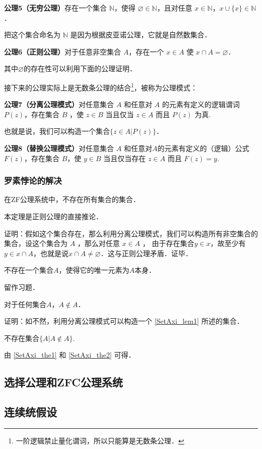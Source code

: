 \textbf{公理5（无穷公理）}存在一个集合 $\mathbb{N}$，使得 $\varnothing\in\mathbb{N}$，且对任意 $x\in \mathbb{N}$，$x\cup\{x\}\in\mathbb{N}$．

把这个集合命名为 $\mathbb{N}$ 是因为根据皮亚诺公理，它就是自然数集合．

\textbf{公理6（正则公理）}对于任意非空集合 $A$，存在一个 $x\in A$ 使 $x\cap A=\varnothing$．

其中$\varnothing$的存在性可以利用下面的公理证明．

接下来的公理实际上是无数条公理的结合\footnote{一阶逻辑禁止量化谓词，所以只能算是无数条公理．}，被称为公理模式：

\textbf{公理7（分离公理模式）}对任意集合 $A$ 和任意对 $A$ 的元素有定义的逻辑谓词 $P(z)$，存在集合 $B$ ，使 $z\in B$ 当且仅当 $z\in A$ 而且 $P(z)$ 为真.

也就是说，我们可以构造一个集合$\{z\in A | P(z)\}$．

\textbf{公理8（替换公理模式）}对任意集合 $A$ 和任意对$A$的元素有定义的（逻辑）公式$F(z)$，存在集合 $B$，使 $y\in B$ 当且仅当存在 $z\in A$ 而且 $F(z)=y$.

\subsubsection{罗素悖论的解决}
\begin{theorem}{}
在ZF公\label{SetAxi_the1}理系统中，不存在所有集合的集合．
\end{theorem}

本定理是正则公理的直接推论．

证明：假如这个集合存在，那么利用分离公理模式，我们可以构造所有非空集合的集合，设这个集合为 $A$ ，那么对任意 $x\in A$ ， 由于存在集合$y\in x$，故至少有$y\in x\cap A$，也就是说$x\cap A\neq\varnothing$．这与正则公理矛盾．证毕．

\begin{lemma}{}\label{SetAxi_lem1}
不存在一个集合$A$，使得它的唯一元素为$A$本身．
\end{lemma}

留作习题．

\begin{theorem}{}\label{SetAxi_the2}
对于任何集合$A$，$A\notin A$．
\end{theorem}

证明：如不然，利用分离公理模式可以构造一个 \autoref{SetAxi_lem1} 所述的集合．

\begin{theorem}{}
不存在集合$\{A|A\notin A\}$.
\end{theorem}

由 \autoref{SetAxi_the1} 和 \autoref{SetAxi_the2} 可得．

\subsection{选择公理和ZFC公理系统}

\subsection{连续统假设}



